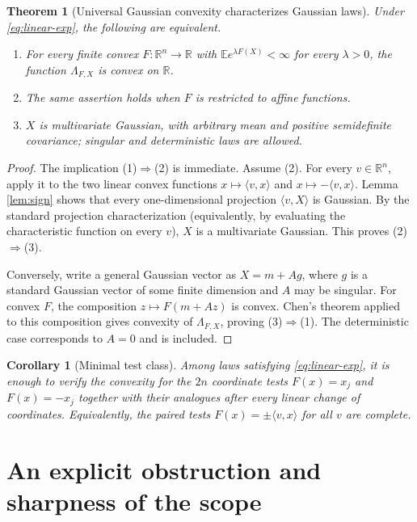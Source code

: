 \documentclass[10pt]{article}
\newtheorem{theorem}{Theorem}
\newtheorem{corollary}{Corollary}
\newcommand{\R}{\mathbb R}
\newcommand{\E}{\mathbb E}
\begin{document}
\begin{theorem}[Universal Gaussian convexity characterizes Gaussian
laws]\label{thm:main}
Under \eqref{eq:linear-exp}, the following are equivalent.
\begin{enumerate}
\item For every finite convex $F:\R^n\to\R$ with
      $\E e^{\lambda F(X)}<\infty$ for every $\lambda>0$, the function
      $\Lambda_{F,X}$ is convex on $\R$.
\item The same assertion holds when $F$ is restricted to affine functions.
\item $X$ is multivariate Gaussian, with arbitrary mean and positive
      semidefinite covariance; singular and deterministic laws are allowed.
\end{enumerate}
\end{theorem}

\begin{proof}
The implication (1)$\Rightarrow$(2) is immediate.  Assume (2).  For every
$v\in\R^n$, apply it to the two linear convex functions
$x\mapsto\langle v,x\rangle$ and $x\mapsto-\langle v,x\rangle$.
Lemma \ref{lem:sign} shows that every one-dimensional projection
$\langle v,X\rangle$ is Gaussian.  By the standard projection
characterization (equivalently, by evaluating the characteristic function
on every $v$), $X$ is a multivariate Gaussian.  This proves (2)$\Rightarrow$(3).

Conversely, write a general Gaussian vector as $X=m+Ag$, where $g$ is a
standard Gaussian vector of some finite dimension and $A$ may be singular.
For convex $F$, the composition $z\mapsto F(m+Az)$ is convex.  Chen's theorem
applied to this composition gives convexity of $\Lambda_{F,X}$, proving
(3)$\Rightarrow$(1).  The deterministic case corresponds to $A=0$ and is
included.
\end{proof}

\begin{corollary}[Minimal test class]
Among laws satisfying \eqref{eq:linear-exp}, it is enough to verify the
convexity for the $2n$ coordinate tests $F(x)=x_j$ and $F(x)=-x_j$ together
with their analogues after every linear change of coordinates.  Equivalently,
the paired tests $F(x)=\pm\langle v,x\rangle$ for all $v$ are complete.
\end{corollary}

\section{An explicit obstruction and sharpness of the scope}
\end{document}
